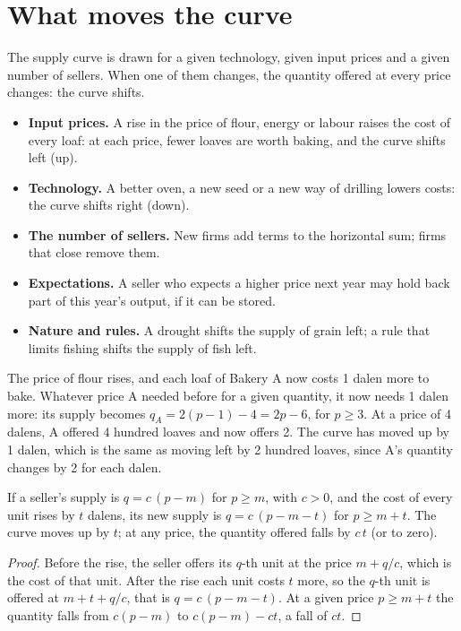 \section{What moves the curve}\label{sec:g10:supply:shifts}

The supply curve is drawn for a given technology, given input prices and a given number of sellers. When one of them changes,
the quantity offered at every price changes: the curve shifts.

\begin{itemize}
\item \textbf{Input prices.} A rise in the price of flour, energy or labour raises the cost of every loaf: at each price, fewer
  loaves are worth baking, and the curve shifts left (up).
\item \textbf{Technology.} A better oven, a new seed or a new way of drilling lowers costs: the curve shifts right (down).
\item \textbf{The number of sellers.} New firms add terms to the horizontal sum; firms that close remove them.
\item \textbf{Expectations.} A seller who expects a higher price next year may hold back part of this year's output, if it can
  be stored.
\item \textbf{Nature and rules.} A drought shifts the supply of grain left; a rule that limits fishing shifts the supply of fish
  left.
\end{itemize}

\begin{example}\label{ex:g10:supply:flour}
The price of flour rises, and each loaf of Bakery A now costs 1 dalen more to bake. Whatever price A needed before for a given
quantity, it now needs 1 dalen more: its supply becomes $q_A = 2(p - 1) - 4 = 2p - 6$, for $p \ge 3$. At a price of 4 dalens, A
offered 4 hundred loaves and now offers 2. The curve has moved up by 1 dalen, which is the same as moving left by 2 hundred
loaves, since A's quantity changes by 2 for each dalen.
\end{example}

\begin{proposition}\label{prop:g10:supply:shift}
If a seller's supply is $q = c\,(p - m)$ for $p \ge m$, with $c > 0$, and the cost of every unit rises by $t$ dalens, its new
supply is $q = c\,(p - m - t)$ for $p \ge m + t$. The curve moves up by $t$; at any price, the quantity offered falls by $c\,t$
(or to zero).
\end{proposition}
\begin{proof}
Before the rise, the seller offers its $q$-th unit at the price $m + q/c$, which is the cost of that unit. After the rise each unit
costs $t$ more, so the $q$-th unit is offered at $m + t + q/c$, that is $q = c\,(p - m - t)$. At a given price $p \ge m + t$ the
quantity falls from $c(p - m)$ to $c(p - m) - ct$, a fall of $ct$.
\end{proof}

